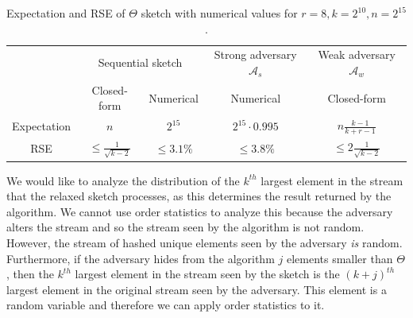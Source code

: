 
\begin{table}[!ht]
    \begin{tabular}{c|cc|cc|cc}
        & \multicolumn{2}{c|}{Sequential sketch} & \multicolumn{2}{c|}{Strong adversary ${\mathcal{A}}_s$} & \multicolumn{2}{c}{Weak adversary ${\mathcal{A}}_w$}   \\%
        & Closed-form& Numerical& \multicolumn{2}{c|}{Numerical} & \multicolumn{2}{c}{Closed-form}   \\%
        \hline
        Expectation & $n$        & $2^{15}$        & \multicolumn{2}{c|}{$2^{15} \cdot 0.995$}          & \multicolumn{2}{c}{$n\frac{k-1}{k+r-1}$} \\%
        RSE & $\leq \frac{1}{\sqrt{k-2}}$        & $\leq 3.1\%$        & \multicolumn{2}{c|}{$\leq 3.8\%$}           & \multicolumn{2}{c}{$\leq 2\frac{1}{\sqrt{k-2}}$}         
    \end{tabular}
    \caption{Expectation and RSE of $\Theta$ sketch with numerical values for $r=8, k=2^{10}, n=2^{15}$.}
    \label{fc-table:Theta-Error-Summary}
\end{table}

We would like to analyze the distribution of the $k^{th}$ largest element in the 
stream that the relaxed sketch processes, as this determines the result returned by the algorithm. 
We cannot use order statistics to analyze this 
because the adversary alters the stream and so the stream seen by the algorithm is not random.
However, the stream of hashed unique elements seen by the adversary \emph{is} random. 
Furthermore, if the adversary hides from the algorithm $j$ elements 
smaller than $\Theta$, then the $k^{th}$ largest element in the stream seen
by the  sketch is the $(k+j)^{th}$ largest element in the original stream seen by the adversary. 
This element is a random variable and therefore we can apply order statistics to it.  

